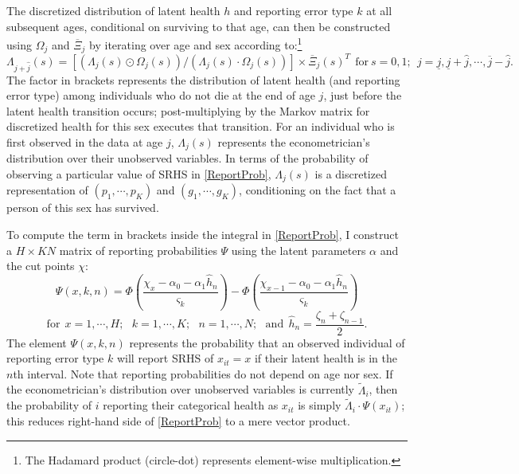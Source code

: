\documentclass[12pt,pdftex,letterpaper]{article}
\newcommand{\Health}{h}
\newcommand{\Report}{x}
\newcommand{\Age}{j}
\newcommand{\Sex}{s}
\newcommand{\AgeMin}{\underline{\Age}}
\newcommand{\AgeMax}{\overline{\Age}}
\newcommand{\AgeIncr}{\hat{\Age}}
\newcommand{\Cut}{\chi}
\newcommand{\DiscreteCut}{\zeta}
\newcommand{\LatentParam}{\alpha}
\newcommand{\TypeProb}{p}
\newcommand{\ReportStd}{\varsigma}
\newcommand{\LivPrb}{\Omega}
\newcommand{\TransPrb}{\Xi}
\newcommand{\HealthDstn}{\Lambda}
\newcommand{\ReportPrb}{\Psi}
\newcommand{\HealthDstnPcvd}{\widetilde{\Lambda}}
\begin{document}
The discretized distribution of latent health $\Health$ and reporting error type $k$ at all subsequent ages, conditional on surviving to that age, can then be constructed using $\LivPrb_\Age$ and $\overline{\TransPrb}_\Age$ by iterating over age and sex according to:\footnote{The Hadamard product (circle-dot) represents element-wise multiplication.}
\begin{equation}
\HealthDstn_{\Age + \AgeIncr}(\Sex) = \left[ (\HealthDstn_{\Age}(\Sex) \odot \LivPrb_\Age(\Sex)) / (\HealthDstn_{\Age}(\Sex) \cdot \LivPrb_\Age(\Sex)) \right] \times \overline{\TransPrb}_{\Age}(\Sex)^T ~~\text{for}~ \Sex=0,1; ~~ \Age = \AgeMin, \AgeMin+\AgeIncr, \cdots, \AgeMax-\AgeIncr.
\end{equation}
The factor in brackets represents the distribution of latent health (and reporting error type) among individuals who do not die at the end of age $\Age$, just before the latent health transition occurs; post-multiplying by the Markov matrix for discretized health for this sex executes that transition. For an individual who is first observed in the data at age $\Age$, $\HealthDstn_\Age(s)$ represents the econometrician's distribution over their unobserved variables. In terms of the probability of observing a particular value of SRHS in \eqref{ReportProb}, $\HealthDstn_\Age(s)$ is a discretized representation of $(\TypeProb_1,\cdots,\TypeProb_K)$ and $(g_1,\cdots,g_K)$, conditioning on the fact that a person of this sex has survived.

To compute the term in brackets inside the integral in \eqref{ReportProb}, I construct a $H \times KN$ matrix of reporting probabilities $\ReportPrb$ using the latent parameters $\LatentParam$ and the cut points $\Cut$:
\begin{equation}
\ReportPrb(\Report,k,n) = \Phi \left(\frac{\Cut_{\Report} - \LatentParam_0 - \LatentParam_1 \hat{\Health}_n}{\ReportStd_k} \right) - \Phi \left(\frac{\Cut_{\Report-1} - \LatentParam_0 - \LatentParam_1 \hat{\Health}_n}{\ReportStd_k} \right)
\end{equation}
\begin{equation*}
\text{for}~~x = 1,\cdots,H; ~~~ k=1,\cdots,K; ~~~ n=1,\cdots,N; ~~~ \text{and}~~ \hat{\Health}_n = \frac{\DiscreteCut_n + \DiscreteCut_{n-1}}{2}.
\end{equation*}
The element $\ReportPrb(\Report,k,n)$ represents the probability that an observed individual of reporting error type $k$ will report SRHS of $\Report_{it}=x$ if their latent health is in the $n$th interval.  Note that reporting probabilities do not depend on age nor sex. If the econometrician's distribution over unobserved variables is currently $\HealthDstnPcvd_{i}$, then the probability of $i$ reporting their categorical health as $\Report_{it}$ is simply $\HealthDstnPcvd_{i} \cdot \ReportPrb(\Report_{it})$; this reduces right-hand side of \eqref{ReportProb} to a mere vector product.
\end{document}

